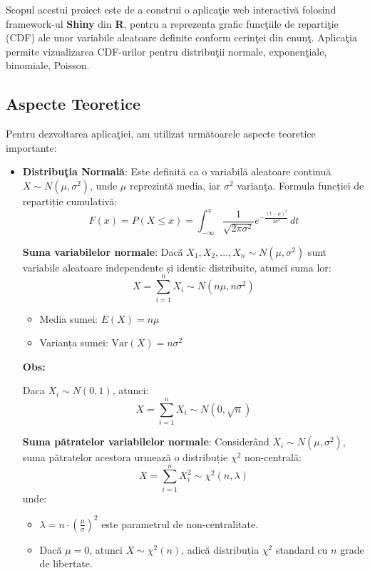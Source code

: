 \documentclass[a4paper,11pt]{article}
\begin{document}
Scopul acestui proiect este de a construi o aplica\c{t}ie web interactiv\u{a} folosind framework-ul \textbf{Shiny} din \textbf{R}, pentru a reprezenta grafic func\c{t}iile de reparti\c{t}ie (CDF) ale unor variabile aleatoare definite conform cerin\c{t}ei din enun\c{t}. Aplica\c{t}ia permite vizualizarea CDF-urilor pentru distribu\c{t}ii normale, exponen\c{t}iale, binomiale, Poisson.


\subsection*{Aspecte Teoretice}
Pentru dezvoltarea aplica\c{t}iei, am utilizat urm\u{a}toarele aspecte teoretice importante:

\begin{itemize}
  \item \textbf{Distribu\c{t}ia Normal\u{a}}: Este definit\u{a} ca o variabil\u{a} aleatoare continu\u{a} $X \sim N(\mu, \sigma^2)$, unde $\mu$ reprezint\u{a} media, iar $\sigma^2$ varian\c{t}a.
  \newline
  Formula funcției de repartiție cumulativă:
  \[
  F(x) = P(X \leq x) = \int_{-\infty}^{x} \frac{1}{\sqrt{2\pi \sigma^2}} e^{-\frac{(t - \mu)^2}{2\sigma^2}} \, dt
  \]

  \textbf{Suma variabilelor normale}:  
  Dacă $X_1, X_2, ..., X_n \sim N(\mu, \sigma^2)$ sunt variabile aleatoare independente și identic distribuite, atunci suma lor:
  \[
  X = \sum_{i=1}^{n} X_i \sim N(n\mu, n\sigma^2)
  \]
  \begin{itemize}
    \item Media sumei: $E(X) = n\mu$
    \item Varianța sumei: $\text{Var}(X) = n\sigma^2$
  \end{itemize}

  \textbf{Obs:}

  Daca $X_i \sim N(0,1)$, atunci:
  \[
  X = \sum_{i=1}^{n} X_i \sim N(0, \sqrt{n})
  \]


  \textbf{Suma pătratelor variabilelor normale}:  
  Considerând $X_i \sim N(\mu, \sigma^2)$, suma pătratelor acestora urmează o distribuție $\chi^2$ non-centrală:
  \[
  X = \sum_{i=1}^{n} X_i^2 \sim \chi^2(n, \lambda)
  \]
  unde:
  \begin{itemize}
    \item $\lambda = n \cdot \left( \frac{\mu}{\sigma} \right)^2$ este parametrul de non-centralitate.
    \item Dacă $\mu = 0$, atunci $X \sim \chi^2(n)$, adică distribuția $\chi^2$ standard cu $n$ grade de libertate.
  \end{itemize}


\end{itemize}
\end{document}
